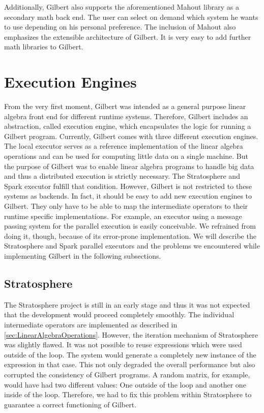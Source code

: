 Additionally, Gilbert also supports the aforementioned Mahout library as a secondary math back end.
The user can select on demand which system he wants to use depending on his personal preference.
The inclusion of Mahout also emphasizes the extensible architecture of Gilbert.
It is very easy to add further math libraries to Gilbert.

\section{Execution Engines}

From the very first moment, Gilbert was intended as a general purpose linear algebra front end for different runtime systems.
Therefore, Gilbert includes an abstraction, called execution engine, which encapsulates the logic for running a Gilbert program.
Currently, Gilbert comes with three different execution engines.
The local executor serves as a reference implementation of the linear algebra operations and can be used for computing little data on a single machine.
But the purpose of Gilbert was to enable linear algebra programs to handle big data and thus a distributed execution is strictly necessary.
The Stratosphere and Spark executor fulfill that condition.
However, Gilbert is not restricted to these systems as backends.
In fact, it should be easy to add new execution engines to Gilbert.
They only have to be able to map the intermediate operators to their runtime specific implementations.
For example, an executor using a message passing system for the parallel execution is easily conceivable.
We refrained from doing it, though, because of its error-prone implementation.
We will describe the Stratosphere and Spark parallel executors and the problems we encountered while implementing Gilbert in the following subsections.

\subsection{Stratosphere}

The Stratosphere project is still in an early stage and thus it was not expected that the development would proceed completely smoothly.
The individual intermediate operators are implemented as described in \cref{sec:LinearAlgebraOperations}.
However, the iteration mechanism of Stratosphere was slightly flawed.
It was not possible to reuse expressions which were used outside of the loop.
The system would generate a completely new instance of the expression in that case.
This not only degraded the overall performance but also corrupted the consistency of Gilbert programs.
A random matrix, for example, would have had two different values: One outside of the loop and another one inside of the loop.
Therefore, we had to fix this problem within Stratosphere to guarantee a correct functioning of Gilbert.

